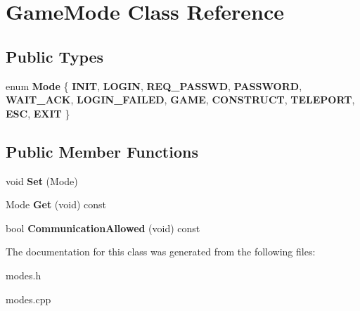 \hypertarget{classGameMode}{\section{\-Game\-Mode \-Class \-Reference}
\label{classGameMode}
}
\subsection*{\-Public \-Types}
\begin{DoxyCompactItemize}
\item 
enum {\bfseries \-Mode} \{ \*
{\bfseries \-I\-N\-I\-T}, 
{\bfseries \-L\-O\-G\-I\-N}, 
{\bfseries \-R\-E\-Q\-\_\-\-P\-A\-S\-S\-W\-D}, 
{\bfseries \-P\-A\-S\-S\-W\-O\-R\-D}, 
\*
{\bfseries \-W\-A\-I\-T\-\_\-\-A\-C\-K}, 
{\bfseries \-L\-O\-G\-I\-N\-\_\-\-F\-A\-I\-L\-E\-D}, 
{\bfseries \-G\-A\-M\-E}, 
{\bfseries \-C\-O\-N\-S\-T\-R\-U\-C\-T}, 
\*
{\bfseries \-T\-E\-L\-E\-P\-O\-R\-T}, 
{\bfseries \-E\-S\-C}, 
{\bfseries \-E\-X\-I\-T}
 \}
\end{DoxyCompactItemize}
\subsection*{\-Public \-Member \-Functions}
\begin{DoxyCompactItemize}
\item 
\hypertarget{classGameMode_a4193e0de55c1aa7a4625901cf8540c3a}{void {\bfseries \-Set} (\-Mode)}\label{classGameMode_a4193e0de55c1aa7a4625901cf8540c3a}

\item 
\hypertarget{classGameMode_a173095ce765ae09f52a3f771a5fb1826}{\-Mode {\bfseries \-Get} (void) const }\label{classGameMode_a173095ce765ae09f52a3f771a5fb1826}

\item 
\hypertarget{classGameMode_aa3b815262ac868c178bf22e959b4fdf4}{bool {\bfseries \-Communication\-Allowed} (void) const }\label{classGameMode_aa3b815262ac868c178bf22e959b4fdf4}

\end{DoxyCompactItemize}


\-The documentation for this class was generated from the following files\-:\begin{DoxyCompactItemize}
\item 
modes.\-h\item 
modes.\-cpp\end{DoxyCompactItemize}
